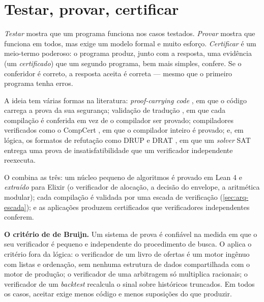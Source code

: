 \section{Testar, provar, certificar}\label{sec:verificacao}

\begin{graduacao}
\emph{Testar} mostra que um programa funciona nos casos testados. \emph{Provar} mostra que funciona em todos, mas exige um modelo formal e muito esforço. \emph{Certificar} é um meio-termo poderoso: o programa produz, junto com a resposta, uma evidência (um \emph{certificado}) que um segundo programa, bem mais simples, confere. Se o conferidor é correto, a resposta aceita é correta --- mesmo que o primeiro programa tenha erros.
\end{graduacao}

A ideia tem várias formas na literatura: \textit{proof-carrying code} \cite{necula1997}, em que o código carrega a prova da sua segurança; validação de tradução \cite{pnueli1998}, em que cada compilação é conferida em vez de o compilador ser provado; compiladores verificados como o CompCert \cite{leroy2009}, em que o compilador inteiro é provado; e, em lógica, os formatos de refutação como DRUP e DRAT \cite{goldberg2003,wetzler2014}, em que um \textit{solver} SAT entrega uma prova de insatisfatibilidade que um verificador independente reexecuta.

O \vapor{} combina as três: um núcleo pequeno de algoritmos é provado em Lean 4 \cite{moura2021} e \emph{extraído} para Elixir (o verificador de alocação, a decisão do envelope, a aritmética modular); cada compilação é validada por uma escada de verificação (\autoref{sec:arq-escada}); e as aplicações produzem certificados que verificadores independentes conferem.

\begin{mestrado}
\textbf{O critério de de Bruijn.} Um sistema de prova é confiável na medida em que o seu verificador é pequeno e independente do procedimento de busca. O \vapor{} aplica o critério fora da lógica: o verificador de um livro de ofertas é um motor ingênuo com listas e ordenação, sem nenhuma estrutura de dados compartilhada com o motor de produção; o verificador de uma arbitragem só multiplica racionais; o verificador de um \textit{backtest} recalcula o sinal sobre históricos truncados. Em todos os casos, aceitar exige menos código e menos suposições do que produzir.
\end{mestrado}

